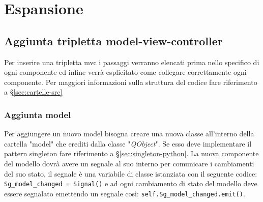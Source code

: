 \section{Espansione}

\subsection{Aggiunta tripletta model-view-controller} \label{sec:aggiuntamvc}
Per inserire una tripletta mvc i passaggi verranno elencati prima nello specifico di ogni componente ed infine verrà esplicitato come collegare correttamente ogni componente. Per maggiori informazioni sulla struttura del codice fare riferimento a \S{}\ref{sec:cartelle-src}

\subsubsection{Aggiunta model}
Per aggiungere un nuovo model bisogna creare una nuova classe all'interno della cartella "model" che erediti dalla classe "\textit{QObject}". Se esso deve implementare il pattern singleton fare riferimento a \S{}\ref{sec:singleton-python}. La nuova componente del modello dovrà avere un segnale al suo interno per comunicare i cambiamenti del suo stato, il segnale è una variabile di classe istanziata con il seguente codice: \texttt{Sg\_model\_changed = Signal()} e ad ogni cambiamento di stato del modello deve essere segnalato emettendo un segnale così: \texttt{self.Sg\_model\_changed.emit()}.


